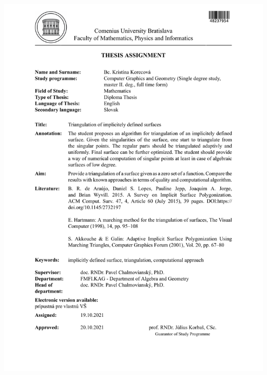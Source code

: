 \documentclass[12pt, twoside]{book}
\begin{document}
\newpage 
\thispagestyle{empty}
\hspace{-2cm}\includegraphics[page=1,width=1.1\textwidth]{images/zadanie-en}
\end{document}
